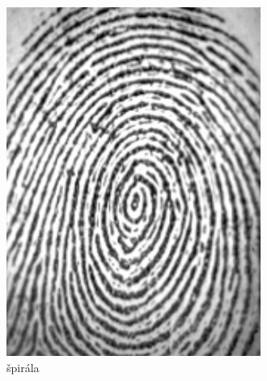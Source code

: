 \begin{figure}[h]
\begin{subfigure}[b]{0.19\linewidth}
      \includegraphics[width=\linewidth]{obrazky-figures/spirala.png}
      \caption{špirála}
      \label{obr:triedy_odtlackov/spirala}
    \end{subfigure}
    \hfill
    \begin{subfigure}[b]{0.19\linewidth}

\end{subfigure}
\end{figure}
